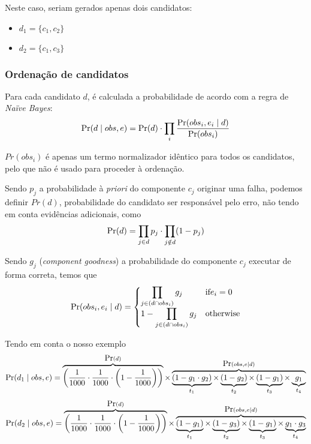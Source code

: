 Neste caso, seriam gerados apenas dois candidatos:

\begin{itemize}
\item $d_1 = \{c_1, c_2\}$ 
\item $d_2 = \{c_1, c_3\}$ 
\end{itemize}

% 
%

\subsubsection{Ordenação de candidatos} 

Para cada candidato $d$, é calculada a probabilidade de acordo com a regra de \emph{Naïve Bayes}:
%
\begin{equation}
	\mbox{Pr}(d\mid obs,e) =  \mbox{Pr}(d) \cdot \prod_{i}\frac{\mbox{Pr}(obs_i, e_i \mid d)}{\mbox{Pr}(obs_i)}
\end{equation}


$Pr(obs_i)$ é apenas um termo normalizador idêntico para todos os candidatos, pelo que não é usado para proceder à ordenação.

Sendo $p_j$ a probabilidade à \emph{priori} do componente $c_j$ originar uma falha, podemos definir $Pr(d)$, probabilidade do candidato ser responsável pelo erro, não tendo em conta evidências adicionais, como
%
\begin{equation}
  \mbox{Pr}(d) = \prod_{j \in d} p_j \cdot \prod_{j \notin d} (1 - p_j)
\end{equation}


Sendo $g_j$ (\emph{component goodness}) a probabilidade do componente $c_j$ executar de forma correta, temos que
% 
\begin{equation}
  \mbox{Pr}(obs_i, e_i \mid  d) = 
  \begin{cases}
    \displaystyle\prod_{j \in (d \cap obs_i)} g_j 		& \textrm{if} e_i = 0 \\
	1 - \displaystyle\prod_{j \in (d \cap obs_i)} g_j  & \textrm{otherwise}
  \end{cases}
\end{equation}

Tendo em conta o nosso exemplo
%
\begin{equation}
    \mbox{Pr}(d_1 \mid obs,e) =
    \overbrace{\bigg(\frac{1}{1000} \cdot \frac{1}{1000} \cdot \bigg(1 - \frac{1}{1000}\bigg)\bigg)}^{\mbox{Pr}(d)}
    \times
    \overbrace{
      \underbrace{(1-g_1 \cdot g_2)}_{t_1}
      \times
      \underbrace{(1-g_2)}_{t_2}
      \times
      \underbrace{(1-g_1)}_{t_3}
      \times
      \underbrace{g_1}_{t_4}
    }^{\mbox{Pr}(obs,e \mid d)}
\end{equation}
%
\begin{equation}
    \mbox{Pr}(d_2 \mid obs,e) =
    \overbrace{\bigg(\frac{1}{1000} \cdot \frac{1}{1000} \cdot \bigg(1 - \frac{1}{1000}\bigg)\bigg)}^{\mbox{Pr}(d)}
    \times
    \overbrace{
      \underbrace{(1-g_1)}_{t_1}
      \times
      \underbrace{(1-g_3)}_{t_2}
      \times
      \underbrace{(1-g_1)}_{t_3}
      \times
      \underbrace{g_1 \cdot g_3}_{t_4}
    }^{\mbox{Pr}(obs,e \mid d)}
\end{equation}


